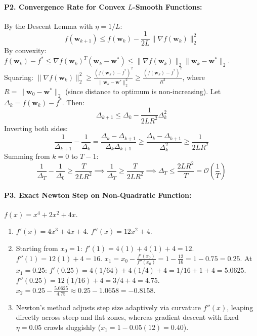 \paragraph{P2. Convergence Rate for Convex $L$-Smooth Functions:}
By the Descent Lemma with $\eta = 1/L$:
\begin{equation*}
f(\mathbf{w}_{k+1}) \le f(\mathbf{w}_k) - \frac{1}{2L}\|\nabla f(\mathbf{w}_k)\|_2^2
\end{equation*}
By convexity: $f(\mathbf{w}_k) - f^* \le \nabla f(\mathbf{w}_k)^T (\mathbf{w}_k - \mathbf{w}^*) \le \|\nabla f(\mathbf{w}_k)\|_2 \|\mathbf{w}_k - \mathbf{w}^*\|_2$.
Squaring: $\|\nabla f(\mathbf{w}_k)\|_2^2 \ge \frac{(f(\mathbf{w}_k) - f^*)^2}{\|\mathbf{w}_k - \mathbf{w}^*\|_2^2} \ge \frac{(f(\mathbf{w}_k) - f^*)^2}{R^2}$, where $R = \|\mathbf{w}_0 - \mathbf{w}^*\|_2$ (since distance to optimum is non-increasing).
Let $\Delta_k = f(\mathbf{w}_k) - f^*$. Then:
\begin{equation*}
\Delta_{k+1} \le \Delta_k - \frac{1}{2L R^2} \Delta_k^2
\end{equation*}
Inverting both sides:
\begin{equation*}
\frac{1}{\Delta_{k+1}} - \frac{1}{\Delta_k} = \frac{\Delta_k - \Delta_{k+1}}{\Delta_k \Delta_{k+1}} \ge \frac{\Delta_k - \Delta_{k+1}}{\Delta_k^2} \ge \frac{1}{2L R^2}
\end{equation*}
Summing from $k = 0$ to $T - 1$:
\begin{equation*}
\frac{1}{\Delta_T} - \frac{1}{\Delta_0} \ge \frac{T}{2L R^2} \implies \frac{1}{\Delta_T} \ge \frac{T}{2L R^2} \implies \Delta_T \le \frac{2L R^2}{T} = \mathcal{O}\left(\frac{1}{T}\right)
\end{equation*}

\paragraph{P3. Exact Newton Step on Non-Quadratic Function:}
$f(x) = x^4 + 2x^2 + 4x$.
\begin{enumerate}[label=(\alph*)]
    \item $f'(x) = 4x^3 + 4x + 4$.
    $f''(x) = 12x^2 + 4$.
    \item Starting from $x_0 = 1$:
    $f'(1) = 4(1) + 4(1) + 4 = 12$.
    $f''(1) = 12(1) + 4 = 16$.
    $x_1 = x_0 - \frac{f'(x_0)}{f''(x_0)} = 1 - \frac{12}{16} = 1 - 0.75 = 0.25$.
    At $x_1 = 0.25$:
    $f'(0.25) = 4(1/64) + 4(1/4) + 4 = 1/16 + 1 + 4 = 5.0625$.
    $f''(0.25) = 12(1/16) + 4 = 3/4 + 4 = 4.75$.
    $x_2 = 0.25 - \frac{5.0625}{4.75} \approx 0.25 - 1.0658 = -0.8158$.
    \item Newton's method adjusts step size adaptively via curvature $f''(x)$, leaping directly across steep and flat zones, whereas gradient descent with fixed $\eta = 0.05$ crawls sluggishly ($x_1 = 1 - 0.05(12) = 0.40$).
\end{enumerate}

